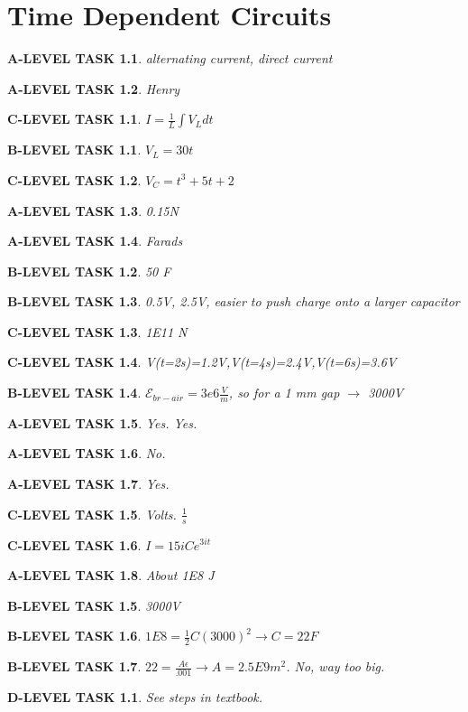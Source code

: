 \documentclass{book}
\numberwithin{equation}{section}
\newtheorem{alevel}{A-LEVEL TASK}
\newtheorem{blevel}{B-LEVEL TASK}
\newtheorem{clevel}{C-LEVEL TASK}
\newtheorem{dlevel}{D-LEVEL TASK}
\theoremstyle{definition}
\begin{document}
\chapter{Time Dependent Circuits}
\begin{alevel}alternating current, direct current\end{alevel}
\begin{alevel}Henry\end{alevel}
\begin{clevel}$I=\frac{1}{L}\int{V_L dt}$\end{clevel}
\begin{blevel}$V_L=30t$\end{blevel}
\begin{clevel}$V_C=t^3+5t+2$\end{clevel}
\begin{alevel}0.15N\end{alevel}
\begin{alevel}Farads\end{alevel}
\begin{blevel}50 F\end{blevel}
\begin{blevel}0.5V, 2.5V, easier to push charge onto a larger capacitor\end{blevel}
\begin{clevel}1E11 N\end{clevel}
\begin{clevel}V(t=2s)=1.2V,V(t=4s)=2.4V,V(t=6s)=3.6V \end{clevel}
\begin{blevel}$\mathcal{E}_{br-air}=3e6 \frac{V}{m}$, so for a 1 mm gap $\rightarrow$ 3000V\end{blevel}

\begin{alevel}Yes. Yes.\end{alevel}
\begin{alevel}No.\end{alevel}
\begin{alevel}Yes.\end{alevel}
\begin{clevel}Volts. $\frac{1}{s}$\end{clevel}
\begin{clevel}$I=15iCe^{3it}$\end{clevel}

\begin{alevel}About 1E8 J\end{alevel}
\begin{blevel}3000V\end{blevel}
\begin{blevel}$1E8=\frac{1}{2}C(3000)^2 \rightarrow C=22F$\end{blevel}
\begin{blevel}$22=\frac{A\epsilon}{.001} \rightarrow A=2.5E9 m^2$. No, way too big.\end{blevel}
\begin{dlevel}See steps in textbook.\end{dlevel}
\end{document}
